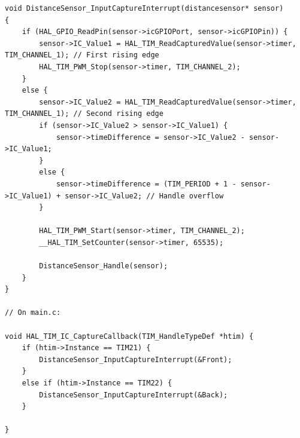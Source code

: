 \documentclass{article}
\begin{document}
\begin{lstlisting}[caption={STM32 HC-SR04 Firmware Implementation}, label={lst:stm32_distancesensor_code}]
void DistanceSensor_InputCaptureInterrupt(distancesensor* sensor)
{
    if (HAL_GPIO_ReadPin(sensor->icGPIOPort, sensor->icGPIOPin)) {
        sensor->IC_Value1 = HAL_TIM_ReadCapturedValue(sensor->timer, TIM_CHANNEL_1); // First rising edge
        HAL_TIM_PWM_Stop(sensor->timer, TIM_CHANNEL_2);
    }
    else {
        sensor->IC_Value2 = HAL_TIM_ReadCapturedValue(sensor->timer, TIM_CHANNEL_1); // Second rising edge
        if (sensor->IC_Value2 > sensor->IC_Value1) {
            sensor->timeDifference = sensor->IC_Value2 - sensor->IC_Value1;
        }
        else {
            sensor->timeDifference = (TIM_PERIOD + 1 - sensor->IC_Value1) + sensor->IC_Value2; // Handle overflow
        }

        HAL_TIM_PWM_Start(sensor->timer, TIM_CHANNEL_2);
        __HAL_TIM_SetCounter(sensor->timer, 65535);

        DistanceSensor_Handle(sensor);
    }
}

// On main.c:

void HAL_TIM_IC_CaptureCallback(TIM_HandleTypeDef *htim) {
    if (htim->Instance == TIM21) {
		DistanceSensor_InputCaptureInterrupt(&Front);
	}
	else if (htim->Instance == TIM22) {
		DistanceSensor_InputCaptureInterrupt(&Back);
	}

}
\end{lstlisting}
\end{document}
